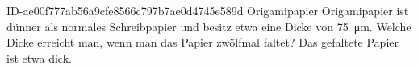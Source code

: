 \begin{exercise}
      {ID-ae00f777ab56a9cfe8566c797b7ae0d4745e589d}
      {Origamipapier}
  \ifproblem\problem
    Origamipapier ist dünner als normales Schreibpapier und besitz etwa eine
    Dicke von \SI{75}{\micro\metre}. Welche Dicke erreicht man, wenn man das
    Papier zwölfmal faltet?
  \fi
  \ifoutcome\outcome
    Das gefaltete Papier ist etwa  dick.
  \fi
\end{exercise}
